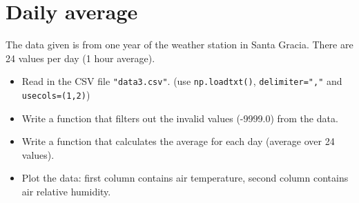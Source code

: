 \section{Daily average}

The data given is from one year of the weather station in Santa Gracia.
There are 24 values per day (1 hour average).

\begin{itemize}
    \item Read in the CSV file \verb|"data3.csv"|. (use \verb|np.loadtxt()|, \verb|delimiter=","| and \verb|usecols=(1,2)|)
    \item Write a function that filters out the invalid values (-9999.0) from the data.
    \item Write a function that calculates the average for each day (average over 24 values).
    \item Plot the data: first column contains air temperature, second column contains air relative humidity.
\end{itemize}

